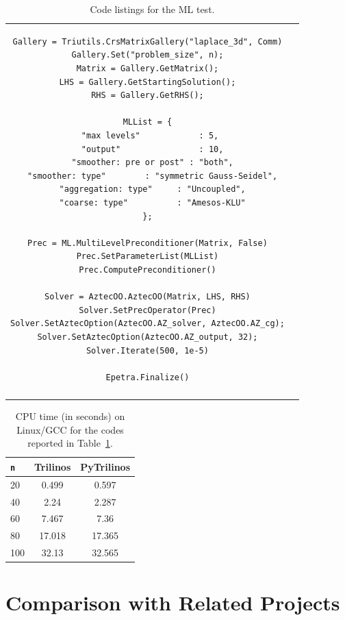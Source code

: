 \documentclass[10pt,relax]{SANDreport}
\begin{document}
\begin{table}
\begin{tabular}{| c  | c|}
\begin{minipage}{10.5cm}
\begin{verbatim}
Gallery = Triutils.CrsMatrixGallery("laplace_3d", Comm)
Gallery.Set("problem_size", n);
Matrix = Gallery.GetMatrix();
LHS = Gallery.GetStartingSolution();
RHS = Gallery.GetRHS();

MLList = {
  "max levels"            : 5, 
  "output"                : 10,
  "smoother: pre or post" : "both",
  "smoother: type"        : "symmetric Gauss-Seidel",
  "aggregation: type"     : "Uncoupled",
  "coarse: type"          : "Amesos-KLU"
};

Prec = ML.MultiLevelPreconditioner(Matrix, False)
Prec.SetParameterList(MLList)
Prec.ComputePreconditioner()

Solver = AztecOO.AztecOO(Matrix, LHS, RHS)
Solver.SetPrecOperator(Prec)
Solver.SetAztecOption(AztecOO.AZ_solver, AztecOO.AZ_cg);
Solver.SetAztecOption(AztecOO.AZ_output, 32);
Solver.Iterate(500, 1e-5)

Epetra.Finalize()
\end{verbatim}
\end{minipage}
\\
&  \\
\hline
\end{tabular}
\caption{Code listings for the ML test.}
\label{tab:code_ml}
\end{table}


\begin{table}
\begin{center}
\begin{tabular}{| l | c | c |}
\hline
\tt n & Trilinos & PyTrilinos \\
\hline
20  & 0.499  & 0.597 \\
40  & 2.24   & 2.287 \\
60  & 7.467  & 7.36 \\
80  & 17.018 & 17.365 \\
100 & 32.13  & 32.565 \\
\hline
\end{tabular}
\caption{CPU time (in seconds) on Linux/GCC for the codes reported in
Table~\ref{tab:code_ml}.}
\label{tab:time_ml}
\end{center}
\end{table}

\section{Comparison with Related Projects}
\label{sec:related}
\end{document}
